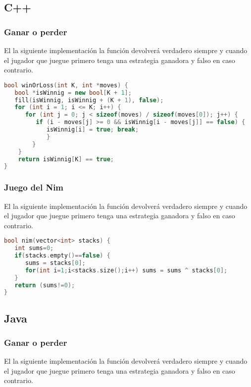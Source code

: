 \subsection{C++}

\subsubsection{Ganar o perder}

El la siguiente implementación la función devolverá verdadero siempre y cuando el jugador que juegue primero tenga una estrategia ganadora y falso en caso contrario.

\begin{lstlisting}[language=C++]
bool winOrLoss(int K, int *moves) {
   bool *isWinnig = new bool[K + 1];
   fill(isWinnig, isWinnig + (K + 1), false);
   for (int i = 1; i <= K; i++) {
      for (int j = 0; j < sizeof(moves) / sizeof(moves[0]); j++) {
         if (i - moves[j] >= 0 && isWinnig[i - moves[j]] == false) {
            isWinnig[i] = true; break;
			}
		}
	}
	return isWinnig[K] == true;
}
\end{lstlisting}

\subsubsection{Juego del Nim}

El la siguiente implementación la función devolverá verdadero siempre y cuando el jugador que juegue primero tenga una estrategia ganadora y falso en caso contrario.

\begin{lstlisting}[language=C++]
bool nim(vector<int> stacks) {
   int sums=0;
   if(stacks.empty()==false) {
      sums = stacks[0];
      for(int i=1;i<stacks.size();i++) sums = sums ^ stacks[0];
   }
   return (sums!=0);
}
\end{lstlisting}

\subsection{Java}

\subsubsection{Ganar o perder}

El la siguiente implementación la función devolverá verdadero siempre y cuando el jugador que juegue primero tenga una estrategia ganadora y falso en caso contrario.

